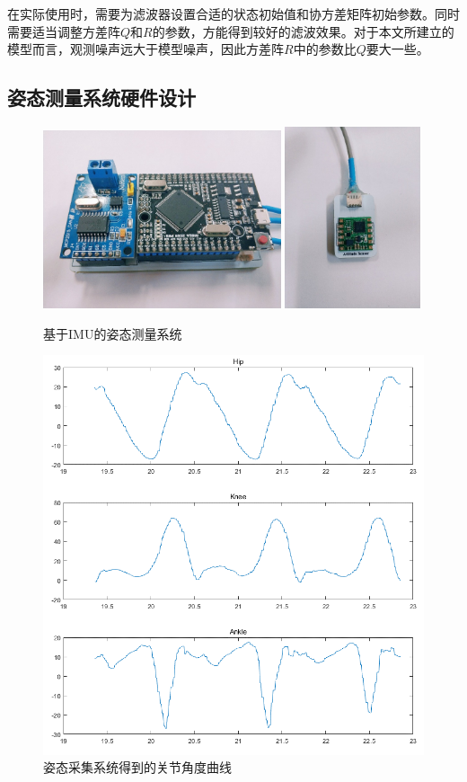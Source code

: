 在实际使用时，需要为滤波器设置合适的状态初始值和协方差矩阵初始参数。同时需要适当调整方差阵$Q$和$R$的参数，方能得到较好的滤波效果。对于本文所建立的模型而言，观测噪声远大于模型噪声，因此方差阵$R$中的参数比$Q$要大一些。

\subsection{姿态测量系统硬件设计}
\begin{figure}[htb]
    \label{fig:sub1}{\includegraphics[width=7cm]{fig/f40.jpg}}\quad
    \label{fig:sub2}{\includegraphics[width=4cm]{fig/f41.jpg}}
    \caption{基于IMU的姿态测量系统}
    \label{fig:subfigss}
\end{figure}

\begin{figure}[!h]
    \includegraphics[width=13.5cm]{fig/f39.png}
    \caption{姿态采集系统得到的关节角度曲线}
    \label{fig:mark}
\end{figure}

